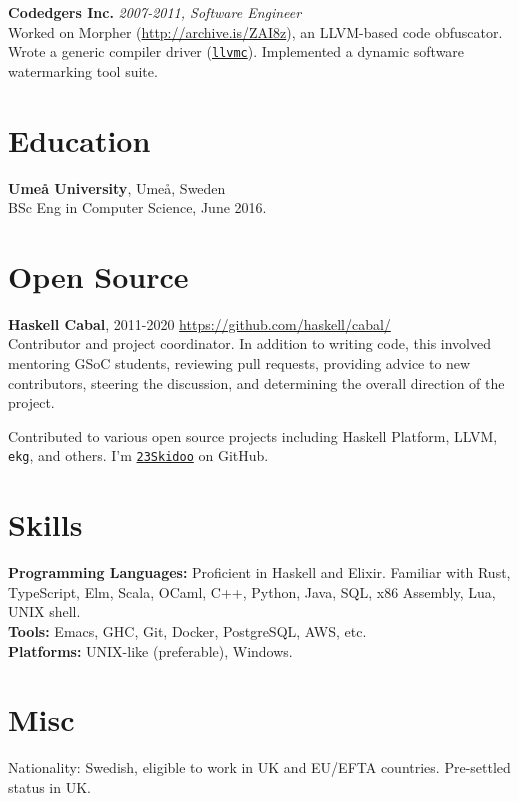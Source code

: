 \documentclass[margin,line]{res}
\begin{document}
\begin{resume}
{\bf Codedgers Inc.} \hfill {\it 2007-2011, Software Engineer}\\
Worked on Morpher (\url{http://archive.is/ZAI8z}), an LLVM-based code
obfuscator. Wrote a generic compiler driver
(\href{http://llvm.org/releases/2.9/docs/CompilerDriver.html}{\texttt{llvmc}}). Implemented
a dynamic software watermarking tool suite.

\section{\sc Education}
{\bf Umeå University}, Umeå, Sweden\\
BSc Eng in Computer Science, June 2016.

\section{\sc Open Source}

{\bf Haskell Cabal}, 2011-2020 \hfill \url{https://github.com/haskell/cabal/}\\
Contributor and project coordinator. In addition to writing code,
this involved mentoring GSoC students, reviewing pull requests,
providing advice to new contributors, steering the discussion, and
determining the overall direction of the project.

Contributed to various open source projects including Haskell
Platform, LLVM, \texttt{ekg}, and others. I'm
\href{https://github.com/23Skidoo/}{\texttt{23Skidoo}} on GitHub.

\section{\sc Skills}

{\bf Programming Languages:} Proficient in Haskell and Elixir. Familiar
with Rust, TypeScript, Elm, Scala, OCaml, C++, Python, Java, SQL, x86 Assembly, Lua, UNIX shell. \\
{\bf Tools:} Emacs, GHC, Git, Docker, PostgreSQL, AWS, etc.\\
{\bf Platforms:} UNIX-like (preferable), Windows.


\section{\sc Misc}

Nationality: Swedish, eligible to work in UK and EU/EFTA countries. Pre-settled status in UK.

\end{resume}
\end{document}

